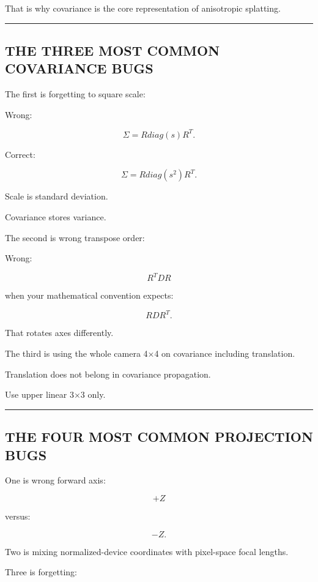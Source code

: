 That is why covariance is the core representation of anisotropic splatting.

\begin{center}\rule{0.5\linewidth}{0.5pt}\end{center}

\subsection{THE THREE MOST COMMON COVARIANCE BUGS}\label{04-visual-computing-ii-ch038-the-three-most-common-covariance-bugs}

The first is forgetting to square scale:

Wrong:

\[
\Sigma=
R
diag(s)
R^T.
\]

Correct:

\[
\boxed{
\Sigma=
R
diag(s^2)
R^T.
}
\]

Scale is standard deviation.

Covariance stores variance.

The second is wrong transpose order:

Wrong:

\[
R^TDR
\]

when your mathematical convention expects:

\[
RDR^T.
\]

That rotates axes differently.

The third is using the whole camera 4×4 on covariance including translation.

Translation does not belong in covariance propagation.

Use upper linear 3×3 only.

\begin{center}\rule{0.5\linewidth}{0.5pt}\end{center}

\subsection{THE FOUR MOST COMMON PROJECTION BUGS}\label{04-visual-computing-ii-ch038-the-four-most-common-projection-bugs}

One is wrong forward axis:

\[
+Z
\]

versus:

\[
-Z.
\]

Two is mixing normalized-device coordinates with pixel-space focal lengths.

Three is forgetting:

